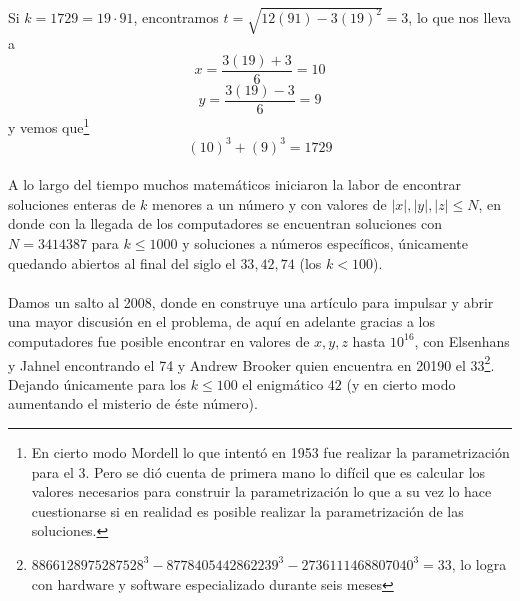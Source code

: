 \documentclass{article}
\begin{document}
\paragraph{} Si $k=1729 = 19\cdot91$, encontramos $t = \sqrt{12(91) - 3(19)^2} = 3$, lo que nos lleva a
$$x = \frac{3(19) + 3}{6} = 10$$
$$y = \frac{3(19) - 3}{6} = 9$$
y vemos que\footnote{En cierto modo Mordell lo que intentó en 1953 fue realizar la parametrización para el 3. Pero se dió cuenta de primera mano lo difícil que es calcular los valores necesarios para construir la parametrización lo que a su vez lo hace cuestionarse si en realidad es posible realizar la parametrización de las soluciones.}
$$(10)^3 + (9)^3 = 1729$$

\paragraph{}A lo largo del tiempo muchos matemáticos iniciaron la labor de encontrar soluciones enteras de $k$ menores a un número y con valores de $|x|, |y|, |z| \leq N$, en donde con la llegada de los computadores se encuentran soluciones con $N = 3414387$ para $k\leq 1000$ y soluciones a números específicos, únicamente quedando abiertos al final del siglo el $33, 42, 74$ (los $k < 100$).
\paragraph{} Damos un salto al 2008, donde en \cite{Bjorn} construye una artículo para impulsar y abrir una mayor discusión en el problema, de aquí en adelante gracias a los computadores fue posible encontrar en valores de $x,y, z$ hasta $10^{16}$, con Elsenhans y Jahnel encontrando el 74 y Andrew Brooker quien encuentra en 20190 el 33\footnote{$8866128975287528^3 - 8778405442862239^3 - 2736111468807040 ^3 = 33$, lo logra con hardware y software especializado durante seis meses}. Dejando únicamente para los $k \leq 100$ el enigmático $42$ (y en cierto modo aumentando el misterio de éste número).
\end{document}
